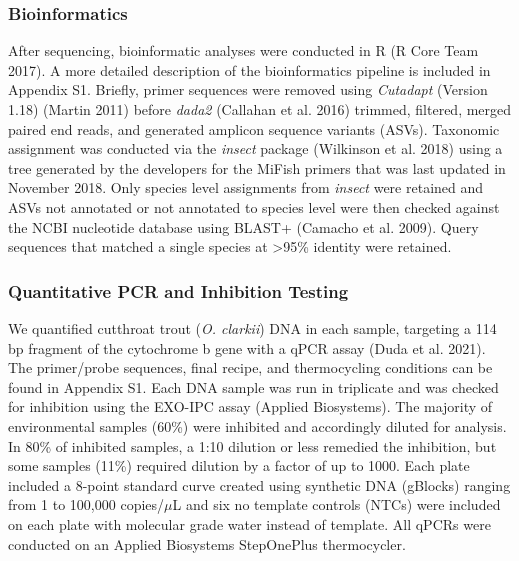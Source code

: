 \documentclass[
]{article}
\begin{document}
\hypertarget{bioinformatics}{%
\subsubsection{Bioinformatics}\label{bioinformatics}}

After sequencing, bioinformatic analyses were conducted in R (R Core
Team 2017). A more detailed description of the bioinformatics pipeline
is included in Appendix S1. Briefly, primer sequences were removed using
\emph{Cutadapt} (Version 1.18) (Martin 2011) before \emph{dada2}
(Callahan et al. 2016) trimmed, filtered, merged paired end reads, and
generated amplicon sequence variants (ASVs). Taxonomic assignment was
conducted via the \emph{insect} package (Wilkinson et al. 2018) using a
tree generated by the developers for the MiFish primers that was last
updated in November 2018. Only species level assignments from
\emph{insect} were retained and ASVs not annotated or not annotated to
species level were then checked against the NCBI nucleotide database
using BLAST+ (Camacho et al. 2009). Query sequences that matched a
single species at \textgreater95\% identity were retained.

\hypertarget{quantitative-pcr-and-inhibition-testing}{%
\subsubsection{Quantitative PCR and Inhibition
Testing}\label{quantitative-pcr-and-inhibition-testing}}

We quantified cutthroat trout (\emph{O. clarkii}) DNA in each sample,
targeting a 114 bp fragment of the cytochrome b gene with a qPCR assay
(Duda et al. 2021). The primer/probe sequences, final recipe, and
thermocycling conditions can be found in Appendix S1. Each DNA sample
was run in triplicate and was checked for inhibition using the EXO-IPC
assay (Applied Biosystems). The majority of environmental samples (60\%)
were inhibited and accordingly diluted for analysis. In 80\% of
inhibited samples, a 1:10 dilution or less remedied the inhibition, but
some samples (11\%) required dilution by a factor of up to 1000. Each
plate included a 8-point standard curve created using synthetic DNA
(gBlocks) ranging from 1 to 100,000 copies/\(\mu\)L and six no template
controls (NTCs) were included on each plate with molecular grade water
instead of template. All qPCRs were conducted on an Applied Biosystems
StepOnePlus thermocycler.
\end{document}

